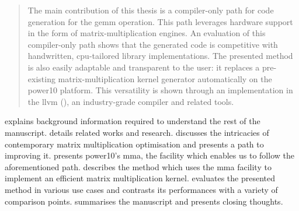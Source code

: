 \documentclass[\main/thesis.tex]{subfiles}
\begin{document}
\begin{quote}
The main contribution of this thesis is a compiler-only path for code generation for the \gls{gemm} operation.
This path leverages hardware support in the form of matrix-multiplication engines.
An evaluation of this compiler-only path shows that the generated code is competitive with handwritten, \gls{cpu}-tailored library implementations.
The presented method is also easily adaptable and transparent to the user: it replaces a pre-existing matrix-multiplication kernel generator automatically on the \gls{power10} platform.
This versatility is shown through an implementation in the \gls{llvm} (), an industry-grade compiler and related tools.
\end{quote}

 explains background information required to understand the rest of the manuscript.
 details related works and research.
 discusses the intricacies of contemporary matrix multiplication optimisation and presents a path to improving it.
 presents \gls{power10}'s \gls{mma}, the facility which enables us to follow the aforementioned path.
 describes the method which uses the \gls{mma} facility to implement an efficient matrix multiplication kernel.
 evaluates the presented method in various use cases and contrasts its performances with a variety of comparison points.
 summarises the manuscript and presents closing thoughts.

\end{document}
